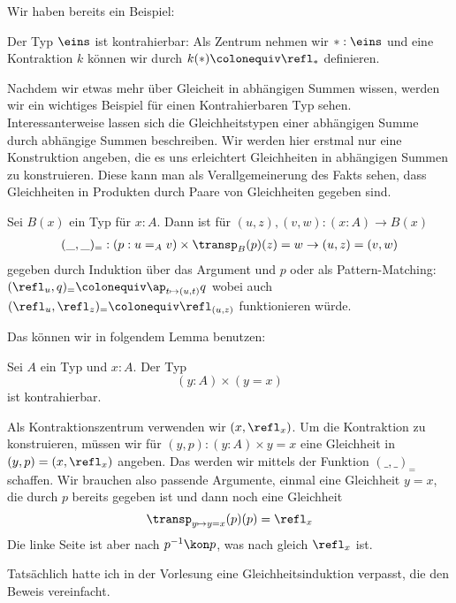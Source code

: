 Wir haben bereits ein Beispiel:
\begin{beispiel}
  Der Typ $\eins$ ist kontrahierbar: Als Zentrum nehmen wir $\ast:\eins$ und
  eine Kontraktion $k$ können wir durch $k(\ast)\colonequiv \refl_\ast$ definieren.
\end{beispiel}

Nachdem wir etwas mehr über Gleicheit in abhängigen Summen wissen, werden wir ein wichtiges Beispiel für einen Kontrahierbaren Typ sehen.
Interessanterweise lassen sich die Gleichheitstypen einer abhängigen Summe durch abhängige Summen beschreiben.
Wir werden hier erstmal nur eine Konstruktion angeben, die es uns erleichtert Gleichheiten in abhängigen Summen zu konstruieren.
Diese kann man als Verallgemeinerung des Fakts sehen, dass Gleichheiten in Produkten durch Paare von Gleichheiten gegeben sind.

\begin{definition}
  Sei $B(x)$ ein Typ für $x:A$.
  Dann ist für $(u,z),(v,w):(x:A)\to B(x)$ 
  \begin{align*}
    (\_,\_)_=:(p:u=_Av)\times \transp_B(p)(z)=w \to (u,z)=(v,w)
  \end{align*}
  gegeben durch Induktion über das Argument und $p$ oder als Pattern-Matching:
  $(\refl_u,q)_=\colonequiv \ap_{t\mapsto (u,t)}q$ wobei auch $(\refl_u,\refl_z)_=\colonequiv \refl_{(u,z)}$ funktionieren würde.
\end{definition}

Das können wir in folgendem Lemma benutzen:

\begin{lemma}
  Sei $A$ ein Typ und $x:A$.
  Der Typ
  \[
     (y:A)\times (y=x)
  \]
  ist kontrahierbar.
\end{lemma}

\begin{beweis}
  Als Kontraktionszentrum verwenden wir $(x,\refl_x)$.
  Um die Kontraktion zu konstruieren, müssen wir für $(y,p):(y:A)\times y=x$ eine Gleichheit in
  $(y,p)=(x,\refl_x)$ angeben.
  Das werden wir mittels der Funktion $(\_,\_)_=$ schaffen.
  Wir brauchen also passende Argumente, einmal eine Gleichheit $y=x$, die durch $p$ bereits gegeben ist und dann noch eine Gleichheit
  \[
    \transp_{y\mapsto y=x}(p)(p)=\refl_x
  \]
  Die linke Seite ist aber nach  $p^{-1}\kon p$,
  was nach  gleich $\refl_x$ ist.
\end{beweis}

Tatsächlich hatte ich in der Vorlesung eine Gleichheitsinduktion verpasst, die den Beweis vereinfacht.

